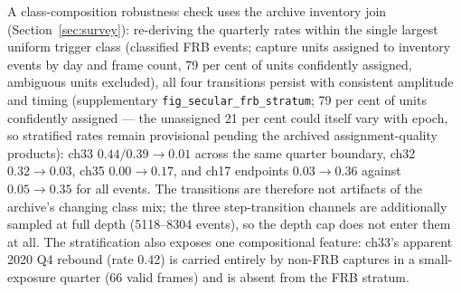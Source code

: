 A class-composition robustness check uses the archive inventory join
(Section~\ref{sec:survey}): re-deriving the quarterly rates within the
single largest uniform trigger class (classified FRB events;
capture units assigned to inventory events by day and frame count, 79
per cent of units confidently assigned, ambiguous units excluded), all
four transitions persist with consistent amplitude and timing
(supplementary \texttt{fig\_secular\_frb\_stratum}; 79 per cent of
units confidently assigned --- the unassigned 21 per cent could itself
vary with epoch, so stratified rates remain provisional pending the
archived assignment-quality products): ch33
$0.44/0.39 \rightarrow 0.01$ across the same quarter boundary, ch32
$0.32 \rightarrow 0.03$, ch35 $0.00 \rightarrow 0.17$, and ch17
endpoints $0.03 \rightarrow 0.36$ against $0.05 \rightarrow 0.35$ for
all events. The transitions are therefore not artifacts of the
archive's changing class mix; the three step-transition channels are
additionally sampled at full depth (5118--8304 events), so the depth
cap does not enter them at all. The stratification also exposes one
compositional feature: ch33's apparent 2020 Q4 rebound (rate 0.42) is
carried entirely by non-FRB captures in a small-exposure quarter (66
valid frames) and is absent from the FRB stratum. 

